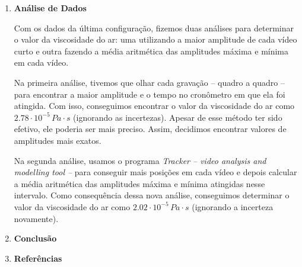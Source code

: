 \documentclass[a4paper, 12pt]{article}
\begin{document}
\begin{multicols}{2}
\begin{enumerate}
		\item \textbf{Análise de Dados}
			\setlength{\parindent}{4ex}
			\par Com os dados da última configuração, fizemos duas análises para determinar o valor da viscosidade do ar: uma utilizando a maior amplitude de cada vídeo curto e outra fazendo a média aritmética das amplitudes máxima e mínima em cada vídeo.
			\par Na primeira análise, tivemos que olhar cada gravação -- quadro a quadro -- para encontrar a maior amplitude e o tempo no cronômetro em que ela foi atingida. Com isso, conseguimos encontrar o valor da viscosidade do ar como $2.78 \cdot 10^{-5} \, Pa \cdot s$ (ignorando as incertezas). Apesar de esse método ter sido efetivo, ele poderia ser mais preciso. Assim, decidimos encontrar valores de amplitudes mais exatos.
			\par Na segunda análise, usamos o programa \textit{Tracker -- video analysis and modelling tool --} para conseguir mais posições em cada vídeo e depois calcular a média aritmética das amplitudes máxima e mínima atingidas nesse intervalo. Como consequência dessa nova análise, conseguimos determinar o valor da viscosidade do ar como $2.02 \cdot 10^{-5} \, Pa \cdot s$ (ignorando a incerteza novamente).
			
		\item \textbf{Conclusão}
		
		\item \textbf{Referências}
		
	\end{enumerate} \end{multicols}
\end{document}
